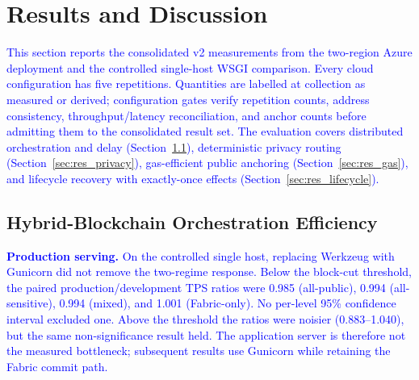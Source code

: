 \documentclass[final,5p,times,twocolumn]{elsarticle}
\begin{document}
%

\section{\textbf{Results and Discussion}}
\label{sec:results}

\textcolor{blue}{This section reports the consolidated v2 measurements from the two-region Azure deployment and the controlled single-host WSGI comparison. Every cloud configuration has five repetitions. Quantities are labelled at collection as measured or derived; configuration gates verify repetition counts, address consistency, throughput/latency reconciliation, and anchor counts before admitting them to the consolidated result set. The evaluation covers distributed orchestration and delay (Section~\ref{sec:res_orch}), deterministic privacy routing (Section~\ref{sec:res_privacy}), gas-efficient public anchoring (Section~\ref{sec:res_gas}), and lifecycle recovery with exactly-once effects (Section~\ref{sec:res_lifecycle}).}

\subsection{\textbf{Hybrid-Blockchain Orchestration Efficiency}}
\label{sec:res_orch}

\textcolor{blue}{\textbf{Production serving.} On the controlled single host, replacing Werkzeug with Gunicorn did not remove the two-regime response. Below the block-cut threshold, the paired production/development TPS ratios were 0.985 (all-public), 0.994 (all-sensitive), 0.994 (mixed), and 1.001 (Fabric-only). No per-level 95\% confidence interval excluded one. Above the threshold the ratios were noisier (0.883--1.040), but the same non-significance result held. The application server is therefore not the measured bottleneck; subsequent results use Gunicorn while retaining the Fabric commit path.}
\end{document}
